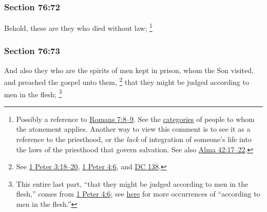 	\subsubsection{Section 76:72} %
		\label{DC76-72}

		Behold, these are they who died without law;%
			\footnote{%
				Possibly a reference to \hyperref[ROMANS-7-8]{Romans 7:8--9}. See the \hyperref[ATONEMENT-categories]{categories} of people to whom the atonement applies. Another way to view this comment is to see it as a reference to the priesthood, or the \textit{lack} of integration of someone's life into the laws of the priesthood that govern salvation. See also \hyperref[ALMA-42-17]{Alma 42:17--22}.
				}


	\subsubsection{Section 76:73} %
		\label{DC76-73}

		And also they who are the spirits of men kept in prison, whom the Son visited, and preached the gospel unto them,%
			\footnote{%
				See \hyperref[1PETER-3-18]{1 Peter 3:18--20}, \hyperref[1PETER-4-6]{1 Peter 4:6}, and \hyperref[DC138]{DC 138}.
				}
		that they might be judged according to men in the flesh;%
			\footnote{%
				This entire last part, ``that they might be judged according to men in the flesh,'' comes from \hyperref[1PETER-4-6]{1 Peter 4:6}; see \hyperref[FLESH-PHRASES]{here} for more occurrences of ``according to men in the flesh.''
				}


